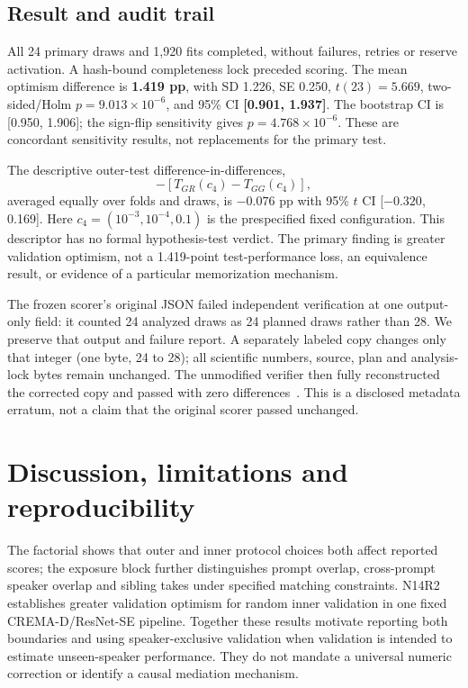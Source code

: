 \documentclass[letterpaper]{article}
\begin{document}
\subsection{Result and audit trail}
All 24 primary draws and 1,920 fits completed, without failures, retries or reserve activation. A hash-bound completeness lock preceded scoring. The mean optimism difference is \textbf{1.419 pp}, with SD 1.226, SE 0.250, $t(23)=5.669$, two-sided/Holm $p=9.013\times10^{-6}$, and 95\% CI \textbf{[0.901, 1.937]}. The bootstrap CI is [0.950, 1.906]; the sign-flip sensitivity gives $p=4.768\times10^{-6}$. These are concordant sensitivity results, not replacements for the primary test.

The descriptive outer-test difference-in-differences,
\begin{equation}
 [T_{GR}(\mathrm{selected})-T_{GG}(\mathrm{selected})]
 -[T_{GR}(c_4)-T_{GG}(c_4)],
\end{equation}
averaged equally over folds and draws, is $-0.076$ pp with 95\% $t$ CI [$-0.320$, 0.169]. Here $c_4=(10^{-3},10^{-4},0.1)$ is the prespecified fixed configuration. This descriptor has no formal hypothesis-test verdict. The primary finding is greater validation optimism, not a 1.419-point test-performance loss, an equivalence result, or evidence of a particular memorization mechanism.

The frozen scorer's original JSON failed independent verification at one output-only field: it counted 24 analyzed draws as 24 planned draws rather than 28. We preserve that output and failure report. A separately labeled copy changes only that integer (one byte, 24 to 28); all scientific numbers, source, plan and analysis-lock bytes remain unchanged. The unmodified verifier then fully reconstructed the corrected copy and passed with zero differences~\cite{artifact}. This is a disclosed metadata erratum, not a claim that the original scorer passed unchanged.

\section{Discussion, limitations and reproducibility}
The factorial shows that outer and inner protocol choices both affect reported scores; the exposure block further distinguishes prompt overlap, cross-prompt speaker overlap and sibling takes under specified matching constraints. N14R2 establishes greater validation optimism for random inner validation in one fixed CREMA-D/ResNet-SE pipeline. Together these results motivate reporting both boundaries and using speaker-exclusive validation when validation is intended to estimate unseen-speaker performance. They do not mandate a universal numeric correction or identify a causal mediation mechanism.
\end{document}
